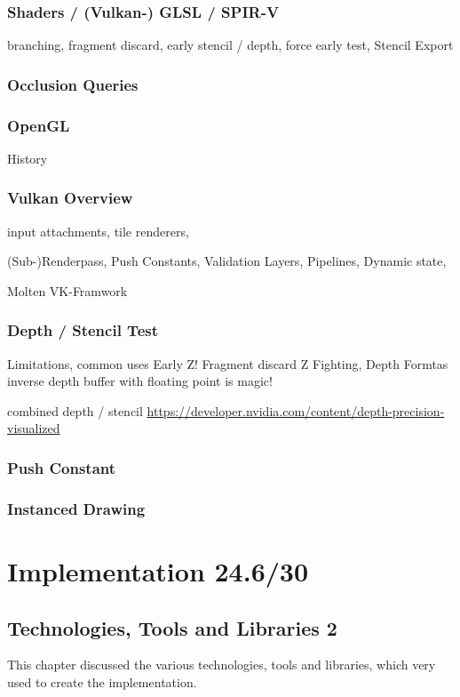 \subsubsection{Shaders / (Vulkan-) GLSL / SPIR-V}
branching, fragment discard, early stencil / depth, force early test, Stencil Export

\subsubsection{Occlusion Queries}

\subsubsection{OpenGL}
History


\subsubsection{Vulkan Overview}
input attachments, tile renderers,

(Sub-)Renderpass, Push Constants, Validation Layers, Pipelines, Dynamic state,

Molten VK-Framwork

\subsubsection{Depth / Stencil Test}
Limitations, common uses
Early Z! Fragment discard
Z Fighting,
Depth Formtas
inverse depth buffer with floating point is magic!

combined depth / stencil
\url{https://developer.nvidia.com/content/depth-precision-visualized}

\subsubsection{Push Constant}

\subsubsection{Instanced Drawing}

\section{Implementation 24.6/30}

\subsection{Technologies, Tools and Libraries 2}
This chapter discussed the various technologies, tools and libraries, which very used to create the implementation.

